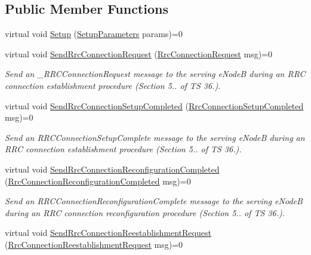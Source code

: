 \subsection*{Public Member Functions}
\begin{DoxyCompactItemize}
\item 
virtual void \hyperlink{classns3_1_1LteUeRrcSapUser_a28a36243a98bfc598df870cd2fadbf85}{Setup} (\hyperlink{structns3_1_1LteUeRrcSapUser_1_1SetupParameters}{Setup\+Parameters} params)=0
\item 
virtual void \hyperlink{classns3_1_1LteUeRrcSapUser_a80618463156c08e91df3737bee253cef}{Send\+Rrc\+Connection\+Request} (\hyperlink{structns3_1_1LteRrcSap_1_1RrcConnectionRequest}{Rrc\+Connection\+Request} msg)=0
\begin{DoxyCompactList}\small\item\em Send an \+\_\+\+R\+R\+C\+Connection\+Request message to the serving e\+NodeB during an R\+RC connection establishment procedure (Section 5.. of TS 36.). \end{DoxyCompactList}\item 
virtual void \hyperlink{classns3_1_1LteUeRrcSapUser_a951f98059d74508b5d419e6144d062c6}{Send\+Rrc\+Connection\+Setup\+Completed} (\hyperlink{structns3_1_1LteRrcSap_1_1RrcConnectionSetupCompleted}{Rrc\+Connection\+Setup\+Completed} msg)=0
\begin{DoxyCompactList}\small\item\em Send an {\itshape R\+R\+C\+Connection\+Setup\+Complete} message to the serving e\+NodeB during an R\+RC connection establishment procedure (Section 5.. of TS 36.). \end{DoxyCompactList}\item 
virtual void \hyperlink{classns3_1_1LteUeRrcSapUser_a3efef9068dfacdd9ac38f7b254b195b2}{Send\+Rrc\+Connection\+Reconfiguration\+Completed} (\hyperlink{structns3_1_1LteRrcSap_1_1RrcConnectionReconfigurationCompleted}{Rrc\+Connection\+Reconfiguration\+Completed} msg)=0
\begin{DoxyCompactList}\small\item\em Send an {\itshape R\+R\+C\+Connection\+Reconfiguration\+Complete} message to the serving e\+NodeB during an R\+RC connection reconfiguration procedure (Section 5.. of TS 36.). \end{DoxyCompactList}\item 
virtual void \hyperlink{classns3_1_1LteUeRrcSapUser_a9f6cf71f54758efefdb1ac5c4aac7418}{Send\+Rrc\+Connection\+Reestablishment\+Request} (\hyperlink{structns3_1_1LteRrcSap_1_1RrcConnectionReestablishmentRequest}{Rrc\+Connection\+Reestablishment\+Request} msg)=0

\end{DoxyCompactItemize}
